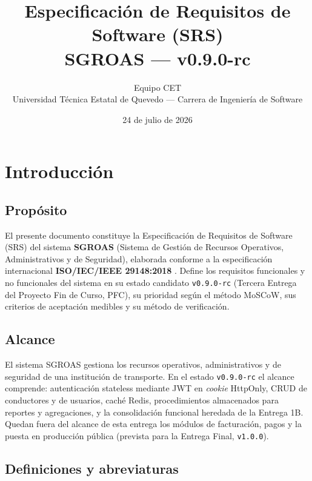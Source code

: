 \documentclass[12pt,a4paper]{article}
\title{Especificación de Requisitos de Software (SRS) \\ SGROAS — v0.9.0-rc}
\author{Equipo CET \\ Universidad Técnica Estatal de Quevedo — Carrera de Ingeniería de Software}
\date{24 de julio de 2026}
\begin{document}
\maketitle
\tableofcontents
\clearpage

\section{Introducción}
\label{sec:introduccion}

\subsection{Propósito}
\label{sec:proposito}

El presente documento constituye la Especificación de Requisitos de Software (SRS) del
sistema \textbf{SGROAS} (Sistema de Gestión de Recursos Operativos, Administrativos y de
Seguridad), elaborada conforme a la especificación internacional \textbf{ISO/IEC/IEEE
29148:2018} \cite{iso29148}. Define los requisitos funcionales y no funcionales del sistema
en su estado candidato \texttt{v0.9.0-rc} (Tercera Entrega del Proyecto Fin de Curso, PFC),
su prioridad según el método MoSCoW, sus criterios de aceptación medibles y su método de
verificación.

\subsection{Alcance}
\label{sec:alcance}

El sistema SGROAS gestiona los recursos operativos, administrativos y de seguridad de una
institución de transporte. En el estado \texttt{v0.9.0-rc} el alcance comprende:
autenticación stateless mediante JWT en \textit{cookie} HttpOnly, CRUD de conductores y de
usuarios, caché Redis, procedimientos almacenados para reportes y agregaciones, y la
consolidación funcional heredada de la Entrega 1B. Quedan fuera del alcance de esta entrega
los módulos de facturación, pagos y la puesta en producción pública (prevista para la
Entrega Final, \texttt{v1.0.0}).

\subsection{Definiciones y abreviaturas}
\label{sec:definiciones}
\end{document}
